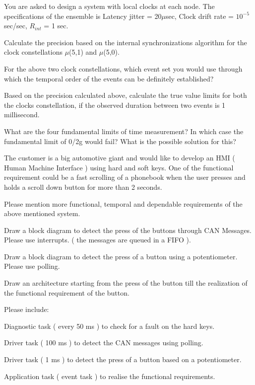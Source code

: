 \pagebreak


You are asked to design a system with local clocks at each node. The specifications of the ensemble is
Latency jitter = 20$\mu$sec,
Clock drift rate = $10^{-5}$ sec/sec,
$R_{int}$ = 1 sec.

\begin{unteraufgaben}

\item Calculate the precision based on the internal synchronizations algorithm for the clock constellations $\mu$(5,1) and $\mu$(5,0). 

\item For the above two clock constellations, which event set you would use through which the temporal order of the events can be definitely established? 

\item Based on the precision calculated above, calculate the true value limits for both the clocks constellation, if the observed duration between two events is 1 millisecond.

\item What are the four fundamental limits of time measurement? In which case the fundamental limit of 0/2g would fail? What is the possible solution for this?

\end{unteraufgaben}




The customer is a big automotive giant and would like to develop an HMI ( Human Machine Interface ) using hard and soft keys. One of the functional requirement could be a fast scrolling of a phonebook when the user presses and holds a scroll down button for more than 2 seconds.
\begin{unteraufgaben}
\item Please mention more functional, temporal and dependable requirements of the above mentioned system.
\item Draw a block diagram to detect the press of the buttons through CAN Messages. Please use interrupts. ( the messages are queued in a FIFO ). 
\item Draw a block diagram to detect the press of a button using a potentiometer. Please use polling.
\item Draw an architecture starting from the press of the button till the realization of the functional requirement of the button.
\item Please include:
\begin{compactenum}[a]
\item Diagnostic task ( every 50 ms ) to check for a fault on the hard keys. 
\item Driver task ( 100 ms ) to detect the CAN messages using polling.
\item Driver task ( 1 ms ) to detect the press of a button based on a potentiometer.
\item Application task ( event task ) to realise the functional requirements.
\end{compactenum}
\end{unteraufgaben}

